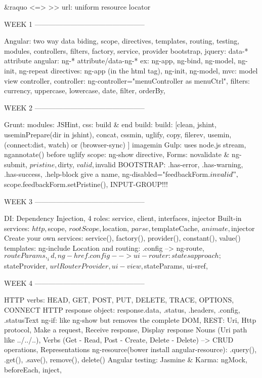 &raquo <=> >>
url: uniform resource locator

WEEK 1 -----------------------------------------------

Angular: two way data biding, scope, directives, templates, routing, testing, modules, controllers, filters, factory, service, provider
bootstrap, jquery: data-* attribute
angular: ng-* attribute/data-ng-* ex: ng-app, ng-bind, ng-model, ng-init, ng-repeat
directives: ng-app (in the html tag), ng-init, ng-model, 
mvc: model view controller, 
controller: ng-controller="menuController as menuCtrl", 
filters: currency, uppercase, lowercase, date, filter, orderBy, 


WEEK 2 -----------------------------------------------

Grunt: modules: JSHint, css: build & end build:  build: [clean, jshint, useminPrepare(dir in jshint), concat, cssmin, uglify, copy, filerev, usemin,
(connect:dist, watch) or (browser-sync) ] imagemin
Gulp: uses node.js stream, ngannotate() before uglify
scope: ng-show directive, 
Forms: novalidate & ng-submit, $pristine, $dirty, $valid, $invalid BOOTSTRAP: .has-error, .has-warning, .has-success, .help-block
give a name, ng-disabled="feedbackForm.$invalid", $scope.feedbackForm.setPristine(), 
INPUT-GROUP!!!

WEEK 3 -----------------------------------------------

DI: Dependency Injection,
4 roles: service, client, interfaces, injector
Built-in services: $http, $scope, $rootScope, $location, $parse, $templateCache, $animate, $injector
Create your own services: service(), factory(), provider(), constant(), value()
templates: ng-include
Location and routing: 
.config --> ng-route, $routeParams, _id, ng-href
.config --> ui-router: states approach; $stateProvider, $urlRouterProvider, ui-view, $stateParams, ui-sref, 


WEEK 4 -----------------------------------------------

HTTP verbs: HEAD, GET, POST, PUT, DELETE, TRACE, OPTIONS, CONNECT
HTTP response object: response.data, .status, .headers, .config, .statusText
ng-if: like ng-show but removes the complete DOM,
REST: Uri, Http protocol, Make a request, Receive response, Display response
Nouns (Uri path like ../../..), Verbs (Get - Read, Post - Create, Delete - Delete) --> CRUD operations, Representations
ng-resource(bower install angular-resource): .query(), .get(), .save(), remove(), delete()
Angular testing: Jasmine & Karma: ngMock, beforeEach, inject, 








